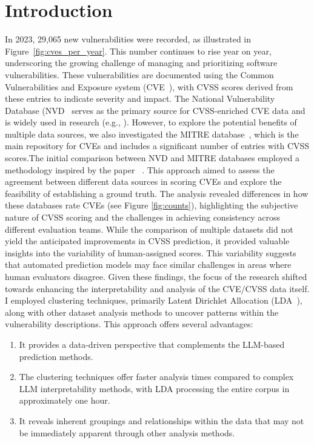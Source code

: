 \documentclass[12pt]{article}
\begin{document}
\section{Introduction}

In 2023, 29,065 new vulnerabilities were recorded, as illustrated in Figure~\ref{fig:cves_per_year}.
This number continues to rise year on year, underscoring the growing challenge of managing and
prioritizing software vulnerabilities. These vulnerabilities are documented using the Common
Vulnerabilities and Exposure system (CVE~\cite{CVE}), with CVSS scores derived from these entries to
indicate severity and impact. The National Vulnerability Database (NVD~\cite{NVD} serves as the
primary source for CVSS-enriched CVE data and is widely used in research (e.g., \cite{costa,
	nvd_example1, nvd_example2}). However, to explore the potential benefits of multiple data sources,
we also investigated the MITRE database~\cite{MITRE}, which is the main repository for CVEs and
includes a significant number of entries with CVSS scores.The initial comparison between NVD and
MITRE databases employed a methodology inspired by the paper ~\cite{bayes}. This approach aimed to assess the
agreement between different data sources in scoring CVEs and explore the feasibility of establishing
a ground truth. The analysis revealed differences in how these databases rate CVEs (see Figure
\ref{fig:counts}), highlighting the subjective nature of CVSS scoring and the challenges in
achieving consistency across different evaluation teams. While the comparison of multiple datasets
did not yield the anticipated improvements in CVSS prediction, it provided valuable insights into
the variability of human-assigned scores. This variability suggests that automated prediction models
may face similar challenges in areas where human evaluators disagree. Given these findings, the
focus of the research shifted towards enhancing the interpretability and analysis of the CVE/CVSS
data itself. I employed clustering techniques, primarily Latent Dirichlet Allocation
(LDA~\cite{lda_origin}), along with other dataset analysis methods to uncover patterns within the
vulnerability descriptions. This approach offers several advantages:

\begin{enumerate}

	\item It provides a data-driven perspective that complements the LLM-based prediction methods.

	\item The clustering techniques offer faster analysis times compared to complex LLM interpretability
	      methods, with LDA processing the entire corpus in approximately one hour.

	\item It reveals inherent groupings and relationships within the data that may not be immediately apparent
	      through other analysis methods.

\end{enumerate}
\end{document}
